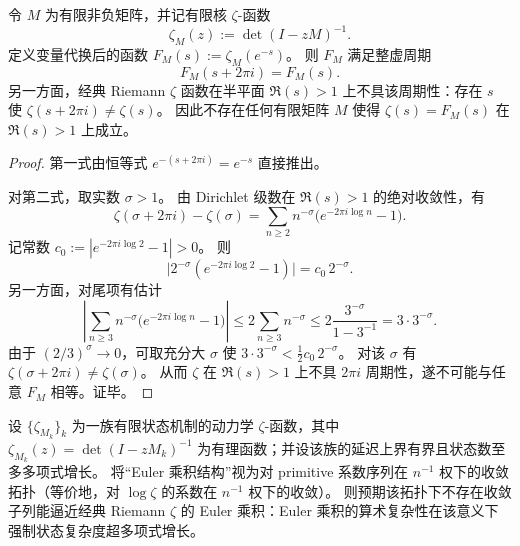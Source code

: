 \begin{theorem}\label{thm:zeta-syntax-finite-zeta-imaginary-periodicity}
令 \(M\) 为有限非负矩阵，并记有限核 \(\zeta\)-函数
\[
\zeta_M(z):=\det(I-zM)^{-1}.
\]
定义变量代换后的函数 \(F_M(s):=\zeta_M(e^{-s})\)。
则 \(F_M\) 满足整虚周期
\[
F_M(s+2\pi i)=F_M(s).
\]
另一方面，经典 Riemann \(\zeta\) 函数在半平面 \(\Re(s)>1\) 上不具该周期性：存在 \(s\) 使 \(\zeta(s+2\pi i)\ne \zeta(s)\)。
因此不存在任何有限矩阵 \(M\) 使得 \(\zeta(s)=F_M(s)\) 在 \(\Re(s)>1\) 上成立。
\end{theorem}
\begin{proof}
第一式由恒等式 \(e^{-(s+2\pi i)}=e^{-s}\) 直接推出。
\par
对第二式，取实数 \(\sigma>1\)。
由 Dirichlet 级数在 \(\Re(s)>1\) 的绝对收敛性，有
\[
\zeta(\sigma+2\pi i)-\zeta(\sigma)
=
\sum_{n\ge 2}n^{-\sigma}\bigl(e^{-2\pi i\log n}-1\bigr).
\]
记常数 \(c_0:=|e^{-2\pi i\log 2}-1|>0\)。
则
\[
\bigl|2^{-\sigma}(e^{-2\pi i\log 2}-1)\bigr|=c_0\,2^{-\sigma}.
\]
另一方面，对尾项有估计
\[
\left|\sum_{n\ge 3}n^{-\sigma}\bigl(e^{-2\pi i\log n}-1\bigr)\right|
\le
2\sum_{n\ge 3}n^{-\sigma}
\le
2\frac{3^{-\sigma}}{1-3^{-1}}
=3\cdot 3^{-\sigma}.
\]
由于 \((2/3)^\sigma\to 0\)，可取充分大 \(\sigma\) 使 \(3\cdot 3^{-\sigma}<\tfrac12 c_0\,2^{-\sigma}\)。
对该 \(\sigma\) 有 \(\zeta(\sigma+2\pi i)\ne \zeta(\sigma)\)。
从而 \(\zeta\) 在 \(\Re(s)>1\) 上不具 \(2\pi i\) 周期性，遂不可能与任意 \(F_M\) 相等。证毕。
\end{proof}

\begin{conjecture}\label{conj:zeta-syntax-euler-topology-unreachable}
设 \(\{\zeta_{M_k}\}_k\) 为一族有限状态机制的动力学 \(\zeta\)-函数，其中
\(
\zeta_{M_k}(z)=\det(I-zM_k)^{-1}
\)
为有理函数；并设该族的延迟上界有界且状态数至多多项式增长。
将“Euler 乘积结构”视为对 primitive 系数序列在 \(n^{-1}\) 权下的收敛拓扑（等价地，对 \(\log\zeta\) 的系数在 \(n^{-1}\) 权下的收敛）。
则预期该拓扑下不存在收敛子列能逼近经典 Riemann \(\zeta\) 的 Euler 乘积：Euler 乘积的算术复杂性在该意义下强制状态复杂度超多项式增长。
\end{conjecture}

